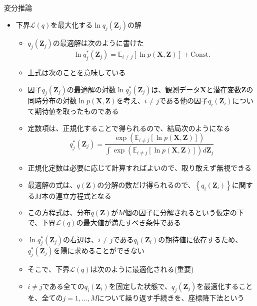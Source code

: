 \documentclass[dvipdfmx,notheorems,t]{beamer}
\begin{document}
\begin{frame}{変分推論}

\begin{itemize}
	\item 下界$\mathcal{L}(q)$を最大化する$\ln q_j(\bm{Z}_j)$の解
	\begin{itemize}
		\item $q_j(\bm{Z}_j)$の最適解は次のように書けた
		\begin{equation}
			\ln q_j^*(\bm{Z}_j) = \mathbb{E}_{i \neq j}[\ln p(\bm{X}, \bm{Z})] + \mathrm{Const.}
		\end{equation}
		
		\item 上式は次のことを意味している
		\item 因子$q_j(\bm{Z}_j)$の最適解の対数$\ln q_j^*(\bm{Z}_j)$は、観測データ$\bm{X}$と潜在変数$\bm{Z}$の\alert{同時分布の対数}$\ln p(\bm{X}, \bm{Z})$\alert{を考え}、$i \neq j$である他の因子$q_i(\bm{Z}_i)$について\alert{期待値を取ったもの}である
		\newline
		
		\item 定数項は、正規化することで得られるので、結局次のようになる
		\begin{equation}
			q_j^*(\bm{Z}_j) = \frac{\exp(\mathbb{E}_{i \neq j}[\ln p(\bm{X}, \bm{Z})])}{\displaystyle \int \exp(\mathbb{E}_{i \neq j}[\ln p(\bm{X}, \bm{Z})]) d\bm{Z}_j}
		\end{equation}
		
		\item 正規化定数は必要に応じて計算すればよいので、取り敢えず無視できる
		\newline
		
		\item 最適解の式は、$q(\bm{Z})$の分解の数だけ得られるので、$\left\{ q_i(\bm{Z}_i) \right\}$に関する$M$本の連立方程式となる
		\item この方程式は、分布$q(\bm{Z})$が$M$個の因子に分解されるという仮定の下で、下界$\mathcal{L}(q)$の最大値が満たすべき条件である
		\newline
		
		\item $\ln q_j^*(\bm{Z}_j)$の右辺は、$i \neq j$である$q_i(\bm{Z}_i)$の期待値に依存するため、$q_j^*(\bm{Z}_j)$を陽に求めることができない
		\item そこで、下界$\mathcal{L}(q)$は次のように最適化される(\alert{重要})
		\newline
		\item $i \neq j$である全ての$q_i(\bm{Z}_i)$を\alert{固定}した状態で、$q_j(\bm{Z}_j)$を最適化することを、全ての$j = 1, \ldots, M$について繰り返す手続きを、\alert{座標降下法}という
	\end{itemize}
\end{itemize}

\end{frame}
\end{document}
